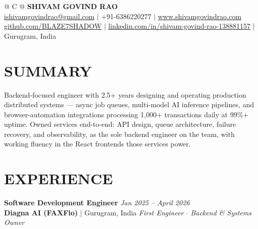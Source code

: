 \documentclass[a4paper,10pt]{article}
\begin{document}
\pagestyle{empty}

\begin{tabularx}{\linewidth}{@{} C @{}}
\Huge{\textbf{SHIVAM GOVIND RAO}} \\[6pt]
\normalsize{\href{mailto:ishivamgovindrao@gmail.com}{ishivamgovindrao@gmail.com} $|$ +91-6386220277 $|$ \href{https://www.shivamgovindrao.com}{www.shivamgovindrao.com}} \\
\normalsize{\href{https://github.com/BLAZE7SHADOW}{github.com/BLAZE7SHADOW} $|$ \href{https://www.linkedin.com/in/shivam-govind-rao-138881157/}{linkedin.com/in/shivam-govind-rao-138881157} $|$ Gurugram, India}
\end{tabularx}

\vspace{3pt}

\section{SUMMARY}

Backend-focused engineer with 2.5+ years designing and operating production distributed systems --- async job queues, multi-model AI inference pipelines, and browser-automation integrations processing 1,000+ transactions daily at 99\%+ uptime. Owned services end-to-end: API design, queue architecture, failure recovery, and observability, as the sole backend engineer on the team, with working fluency in the React frontends those services power.

\section{EXPERIENCE}

\textbf{Software Development Engineer} \hfill \textit{Jan 2025 -- April 2026}\\
\textbf{Diagna AI (FAXFlo)} $|$ Gurugram, India \hfill \textit{First Engineer $\cdot$ Backend \& Systems Owner}
\end{document}
